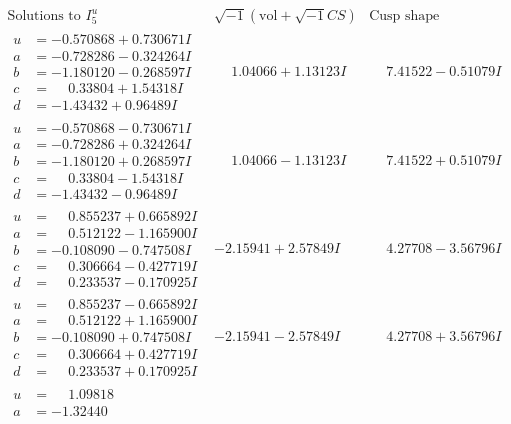 \documentclass[1p]{elsarticle_modified}
\theoremstyle{definition}
\newcommand{\I}{\sqrt{-1}}
\begin{document}
$$\begin{array}{c|c|c}  
\text{Solutions to }I^u_{5}& \I (\text{vol} + \sqrt{-1}CS) & \text{Cusp shape}\\
 \hline 
\begin{aligned}
u &= -0.570868 + 0.730671 I \\
a &= -0.728286 - 0.324264 I \\
b &= -1.180120 - 0.268597 I \\
c &= \phantom{-}0.33804 + 1.54318 I \\
d &= -1.43432 + 0.96489 I\end{aligned}
 & \phantom{-}1.04066 + 1.13123 I & \phantom{-}7.41522 - 0.51079 I \\ \hline\begin{aligned}
u &= -0.570868 - 0.730671 I \\
a &= -0.728286 + 0.324264 I \\
b &= -1.180120 + 0.268597 I \\
c &= \phantom{-}0.33804 - 1.54318 I \\
d &= -1.43432 - 0.96489 I\end{aligned}
 & \phantom{-}1.04066 - 1.13123 I & \phantom{-}7.41522 + 0.51079 I \\ \hline\begin{aligned}
u &= \phantom{-}0.855237 + 0.665892 I \\
a &= \phantom{-}0.512122 - 1.165900 I \\
b &= -0.108090 - 0.747508 I \\
c &= \phantom{-}0.306664 - 0.427719 I \\
d &= \phantom{-}0.233537 - 0.170925 I\end{aligned}
 & -2.15941 + 2.57849 I & \phantom{-}4.27708 - 3.56796 I \\ \hline\begin{aligned}
u &= \phantom{-}0.855237 - 0.665892 I \\
a &= \phantom{-}0.512122 + 1.165900 I \\
b &= -0.108090 + 0.747508 I \\
c &= \phantom{-}0.306664 + 0.427719 I \\
d &= \phantom{-}0.233537 + 0.170925 I\end{aligned}
 & -2.15941 - 2.57849 I & \phantom{-}4.27708 + 3.56796 I \\ \hline\begin{aligned}
u &= \phantom{-}1.09818\phantom{ +0.000000I} \\
a &= -1.32440\phantom{ +0.000000I} \\

\end{aligned}
\end{array}$$
\end{document}
